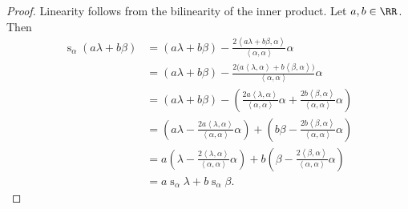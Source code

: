 \documentclass{article}
\newcommand{\innerproduct}[2]{\ensuremath{\left\langle #1 , #2 \right\rangle}}
\DeclareMathOperator{\s}{s}
\begin{document}
\begin{proof}
    Linearity follows from the bilinearity of the inner product.
    Let $a,b \in \RR$.
    Then
    \begin{align*}
        \s_\alpha (a\lambda+b\beta)
        &=
        (a\lambda+b\beta) - \frac{2\innerproduct{a\lambda+b\beta}{\alpha}}{\innerproduct{\alpha}{\alpha}}\alpha \\
        &=
        (a\lambda+b\beta) - \frac{2\Big(a\innerproduct{\lambda}{\alpha}+b\innerproduct{\beta}{\alpha}\Big)}{\innerproduct{\alpha}{\alpha}}\alpha \\
        &=
        (a\lambda+b\beta) - \left(\frac{2a\innerproduct{\lambda}{\alpha}}{\innerproduct{\alpha}{\alpha}}\alpha + \frac{2b\innerproduct{\beta}{\alpha}}{\innerproduct{\alpha}{\alpha}}\alpha\right) \\
        &=
        \left(a\lambda - \frac{2a\innerproduct{\lambda}{\alpha}}{\innerproduct{\alpha}{\alpha}}\alpha\right) +
        \left(b\beta - \frac{2b\innerproduct{\beta}{\alpha}}{\innerproduct{\alpha}{\alpha}}\alpha\right) \\
        &=
        a\left(\lambda - \frac{2\innerproduct{\lambda}{\alpha}}{\innerproduct{\alpha}{\alpha}}\alpha\right) +
        b\left(\beta - \frac{2\innerproduct{\beta}{\alpha}}{\innerproduct{\alpha}{\alpha}}\alpha\right) \\
        &=
        a\s_\alpha\lambda + b \s_\alpha\beta.
    \end{align*}
    

\end{proof}
\end{document}

